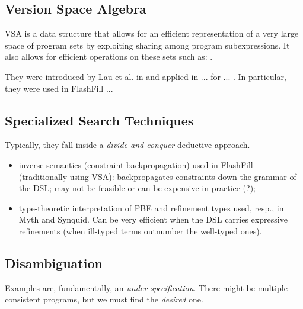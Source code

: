 \subsection{Version Space Algebra}

\ac{VSA} is a data structure that allows for an efficient representation of a
very large space of program sets by exploiting sharing among program
subexpressions. It also allows for efficient operations on these sets such as:
.

They were introduced by Lau et al. in \cite{Lau:2000} and applied in ... for ...
. In particular, they were used in FlashFill ...


\subsection{Specialized Search Techniques}
\label{sec:pbe-search-techniques}

Typically, they fall inside a \textit{divide-and-conquer} deductive approach. 

\begin{itemize}
\item inverse semantics (constraint backpropagation) used in FlashFill
(traditionally using \ac{VSA}): backpropagates constraints down the grammar of
the \ac{DSL}; may not be feasible or can be expensive in practice (?);
\item type-theoretic interpretation of \ac{PBE} and refinement types used, resp.,
in Myth and Synquid. Can be very efficient when the \ac{DSL} carries expressive
refinements (when ill-typed terms outnumber the well-typed ones).
\end{itemize}

\subsection{Disambiguation}
\label{sec:resolving-ambiguity}

Examples are, fundamentally, an \textit{under-specification}. There might be
multiple consistent programs, but we must find the \textit{desired} one.


